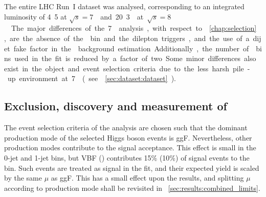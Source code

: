 
The entire LHC Run~I dataset was analysed, corresponding to an integrated luminosity of 
\unit{4.5}{\invfb} at \unit{$\sqrt{s} = 7$}{\TeV} and \unit{20.3}{\invfb} at 
\unit{$\sqrt{s} = 8$}{\TeV}. The major differences of the \unit{7}{\TeV} analysis, with 
respect to \Chapter~\ref{chap:selection}, are the absence of the \twojet bin and the 
dilepton triggers, and the use of a dijet fake factor in the \Wjets background estimation. 
Additionally, the number of \mt bins used in the fit is reduced by a factor of two.
Some minor differences also exist in the object and event selection criteria due to the less 
harsh pile-up environment at \unit{7}{\TeV} (see \Section~\ref{sec:dataset:dataset}).



\subsection{Exclusion, discovery and measurement of \ggHWW}
\label{sec:results:ggF_limits}

The event selection criteria of the \ggHWW analysis are chosen such that the dominant 
production mode of the selected Higgs boson events is ggF. Nevertheless, other production 
modes contribute to the signal acceptance. This effect is small in the 0-jet and 1-jet bins, 
but VBF (\VH) contributes 15\% (10\%) of signal events to the \twojet bin. Such events are 
treated as signal in the fit, and their expected yield is scaled by the same $\mu$ as ggF. 
This has a small effect upon the results, and splitting $\mu$ according to production 
mode shall be revisited in \Section~\ref{sec:results:combined_limits}.

